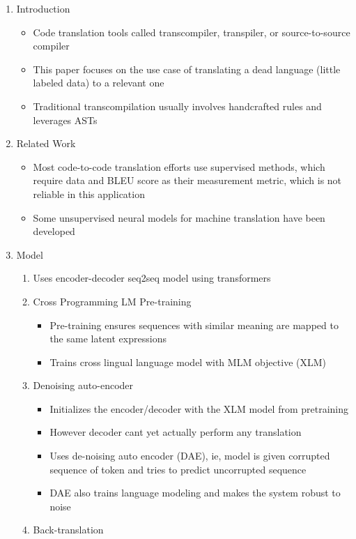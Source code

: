 \documentclass{article}
\begin{document}
\begin{enumerate}
	\item Introduction
	\begin{itemize}
		\item Code translation tools called transcompiler, transpiler, or source-to-source compiler
		\item This paper focuses on the use case of translating a dead language (little labeled data) to a relevant one
		\item Traditional transcompilation usually involves handcrafted rules and leverages ASTs
	\end{itemize}
	\item Related Work
	\begin{itemize}
		\item Most code-to-code translation efforts use supervised methods, which require data and BLEU score as their measurement metric, which is not reliable in this application
		\item Some unsupervised neural models for machine translation have been developed
	\end{itemize}
	\item Model
	\begin{enumerate}
		\item Uses encoder-decoder seq2seq model using transformers
		\item Cross Programming LM Pre-training
		\begin{itemize}
			\item Pre-training ensures sequences with similar meaning are mapped to the same latent expressions
			\item Trains cross lingual language model with MLM objective (XLM)
		\end{itemize}
		\item Denoising auto-encoder
		\begin{itemize}
			\item Initializes the encoder/decoder with the XLM model from pretraining
			\item However decoder cant yet actually perform any translation
			\item Uses de-noising auto encoder (DAE), ie, model is given corrupted sequence of token and tries to predict uncorrupted sequence
			\item DAE also trains language modeling and makes the system robust to noise
		\end{itemize}
		\item Back-translation
		\begin{itemize}

\end{itemize}
\end{enumerate}
\end{enumerate}
\end{document}
